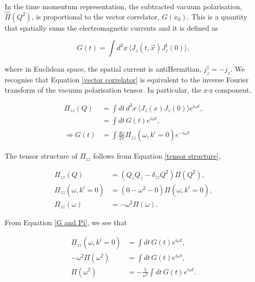 \documentclass{article}
\numberwithin{equation}{section} %
\begin{document}
In the time momentum representation, the subtracted vacuum polarisation, $\hat{\Pi}(Q^2)$, is proportional to the vector correlator, $G(x_0)$. This is a quantity that spatially sums the electromagnetic currents and it is defined as

\begin{equation}
G(t) = \int d^3x \, \langle J_z(t,\vec{x})J_z^\dag(0)\rangle,
\label{vector correlator}
\end{equation}

\noindent where in Euclidean space, the spatial current is antiHermitian, $j^\dag_z=-j_z$\cite{vector}. We recognise that Equation \ref{vector correlator} is equivalent to the inverse Fourier transform of the vacuum polarisation tensor. In particular, the z-z component,

\begin{equation}
\begin{split}
\Pi_{zz}(Q) &= \int dt\,d^3x \, \langle J_z(x) J_z(0)\rangle e^{i\omega t},\\
&= \int dt \, G(t) e^{i\omega t},\\
\Rightarrow G(t) &= \int \frac{d\omega}{2\pi} \Pi_{zz}(\omega,k^i=0)e^{-i\omega t}
\end{split}
\label{G and Pi}
\end{equation}

\noindent The tensor structure of $\Pi_{zz}$ follows from Equation \ref{tensor structure},

\begin{equation}
\begin{split}
\Pi_{zz}(Q) &=\left(Q_z Q_z - \delta_{zz}Q^2 \right)\Pi(Q^2),\\
\Pi_{zz}(\omega,k^i=0) &=\left(0 - \omega^2 - 0 \right)\Pi(\omega,k^i=0),\\
\Pi_{zz}(\omega) &= -\omega^2\Pi(\omega).
\end{split}
\end{equation}

\noindent From Equation \ref{G and Pi}, we see that 

\begin{equation}
\begin{split}
\Pi_{zz}(\omega,k^i=0)&= \int dt \, G(t) e^{i\omega t},\\
-\omega^2\Pi(\omega^2)&= \int dt \, G(t) e^{i\omega t},\\
\Pi(\omega^2)&= -\frac{1}{\omega^2}\int dt \, G(t) e^{i\omega t}.
\end{split}
\end{equation}
\end{document}
